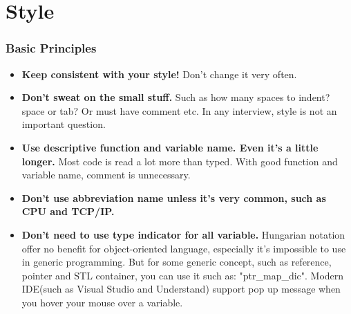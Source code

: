 \documentclass[a4paper,12pt,twoside]{book}
\begin{document}
\section{Style}
\subsubsection{Basic Principles}
\begin{itemize}
	\item \textbf{Keep consistent with your style!} Don't change it very often.
	
	\item \textbf{Don't sweat on the small stuff.} Such as how many spaces to indent? space or tab? Or must have comment etc. In any interview, style is not an important question.
	
	\item \textbf{Use descriptive function and variable name. Even it's a little longer.} Most code is read a lot more than typed. With good function and variable name, comment is unnecessary.
	
	\item \textbf{Don't use abbreviation name unless it's very common, such as CPU and TCP/IP.}
	
	\item \textbf{Don't need to use type indicator for all variable.} Hungarian notation offer no benefit for object-oriented language, especially it's impossible to use in generic programming. But for some generic concept, such as reference, pointer and STL container, you can use it such as: "ptr\_map\_dic". Modern IDE(such as Visual Studio and Understand) support pop up message when you hover your mouse over a variable.
\end{itemize}
\end{document}
